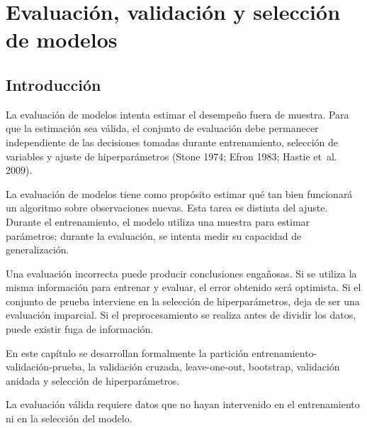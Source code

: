 \documentclass[
  spanish,
  10.5pt,
  letterpaper,
  DIV=11,
  numbers=noendperiod,
  oneside,
  open=any]{scrreprt}
\theoremstyle{definition}
\theoremstyle{definition}
\theoremstyle{plain}
\theoremstyle{remark}
\begin{document}
\chapter{Evaluación, validación y selección de
modelos}\label{sec-evaluacion-modelos}

\section*{Introducción}\label{introducciuxf3n-7}


La evaluación de modelos intenta estimar el desempeño fuera de muestra.
Para que la estimación sea válida, el conjunto de evaluación debe
permanecer independiente de las decisiones tomadas durante
entrenamiento, selección de variables y ajuste de hiperparámetros (Stone
1974; Efron 1983; Hastie et~al. 2009).

La evaluación de modelos tiene como propósito estimar qué tan bien
funcionará un algoritmo sobre observaciones nuevas. Esta tarea es
distinta del ajuste. Durante el entrenamiento, el modelo utiliza una
muestra para estimar parámetros; durante la evaluación, se intenta medir
su capacidad de generalización.

Una evaluación incorrecta puede producir conclusiones engañosas. Si se
utiliza la misma información para entrenar y evaluar, el error obtenido
será optimista. Si el conjunto de prueba interviene en la selección de
hiperparámetros, deja de ser una evaluación imparcial. Si el
preprocesamiento se realiza antes de dividir los datos, puede existir
fuga de información.

En este capítulo se desarrollan formalmente la partición
entrenamiento-validación-prueba, la validación
cruzada, leave-one-out, bootstrap, validación
anidada y selección de hiperparámetros.

\begin{tcolorbox}[enhanced jigsaw, arc=.35mm, bottomrule=.15mm, bottomtitle=1mm, breakable, colback=white, colbacktitle=quarto-callout-important-color!10!white, colframe=quarto-callout-important-color-frame, coltitle=black, left=2mm, leftrule=.75mm, opacityback=0, opacitybacktitle=0.6, rightrule=.15mm, title=\textcolor{quarto-callout-important-color}{\faExclamation}\hspace{0.5em}{Principio esencial}, titlerule=0mm, toprule=.15mm, toptitle=1mm]

La evaluación válida requiere datos que no hayan intervenido en el
entrenamiento ni en la selección del modelo.

\end{tcolorbox}
\end{document}
